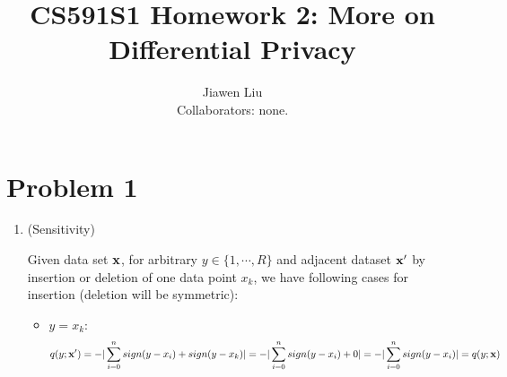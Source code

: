 \documentclass[11pt]{article}
\begin{document}
\title{
{\textbf{CS591S1 Homework 2: More on Differential Privacy}}
}
\author{Jiawen Liu\\
Collaborators: none.}

\date{}
\maketitle

\section{Problem 1}

\begin{enumerate}
	\item (Sensitivity)

	Given data set $\mathbf{x}$, for arbitrary $y\in \{ 1, \cdots, R \}$ and adjacent dataset $\mathbf{x}'$ by insertion or deletion of one data point $x_k$, we have following cases for insertion (deletion will be symmetric):
	\begin{itemize}
		\item $y = x_k$:
		\[
		q(y; \mathbf{x}') 
		= - | \sum_{i = 0}^{n} sign(y - x_i) + sign( y - x_k) | 
		= - | \sum_{i = 0}^{n} sign(y - x_i) + 0 |
		= - | \sum_{i = 0}^{n} sign(y - x_i) |
		= q(y; \mathbf{x})
		\]


\end{itemize}
\end{enumerate}
\end{document}
